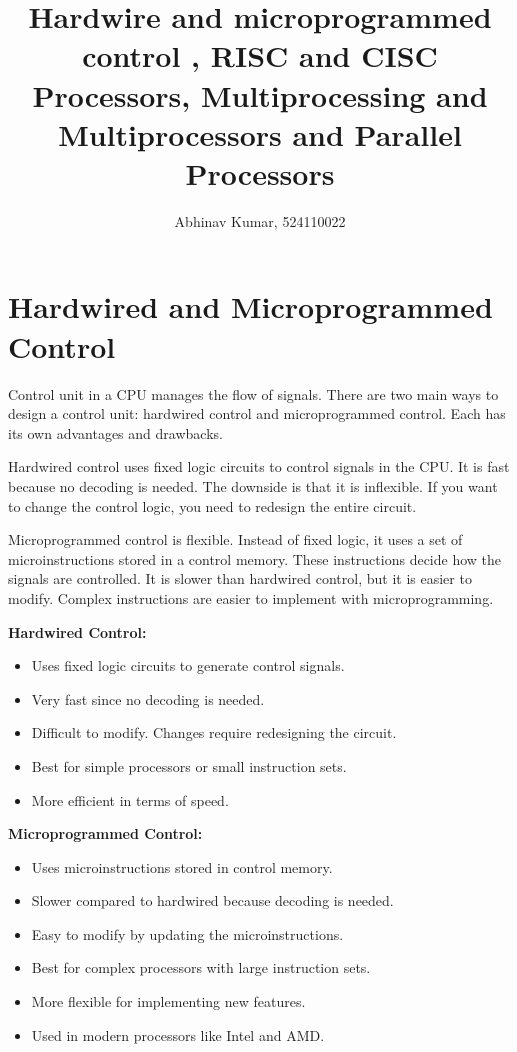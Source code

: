\documentclass[12pt]{article}
\title{Hardwire and microprogrammed control , RISC and CISC Processors, Multiprocessing and Multiprocessors and Parallel Processors}
\author{Abhinav Kumar, 524110022}
\begin{document}
\maketitle
\newpage
\section*{Hardwired and Microprogrammed Control}
Control unit in a CPU manages the flow of signals. There are two main ways to design a control unit: hardwired control and microprogrammed control. Each has its own advantages and drawbacks. 

Hardwired control uses fixed logic circuits to control signals in the CPU. It is fast because no decoding is needed. The downside is that it is inflexible. If you want to change the control logic, you need to redesign the entire circuit.

Microprogrammed control is flexible. Instead of fixed logic, it uses a set of microinstructions stored in a control memory. These instructions decide how the signals are controlled. It is slower than hardwired control, but it is easier to modify. Complex instructions are easier to implement with microprogramming.


\begin{multicols}{2}
    \textbf{Hardwired Control:}
    \begin{itemize}
        \item Uses fixed logic circuits to generate control signals.
        \item Very fast since no decoding is needed.
        \item Difficult to modify. Changes require redesigning the circuit.
        \item Best for simple processors or small instruction sets.
        \item More efficient in terms of speed.
    \end{itemize}
    
    \columnbreak
    
    \textbf{Microprogrammed Control:}
    \begin{itemize}
        \item Uses microinstructions stored in control memory.
        \item Slower compared to hardwired because decoding is needed.
        \item Easy to modify by updating the microinstructions.
        \item Best for complex processors with large instruction sets.
        \item More flexible for implementing new features.
        \item Used in modern processors like Intel and AMD.
    \end{itemize}
\end{multicols}
\newpage
\end{document}
